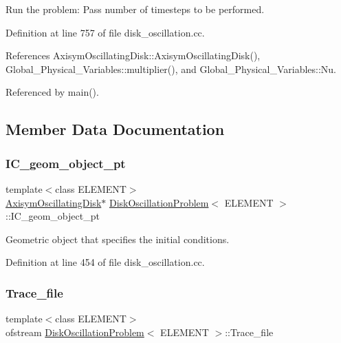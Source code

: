 Run the problem\+: Pass number of timesteps to be performed. 



Definition at line 757 of file disk\+\_\+oscillation.\+cc.



References Axisym\+Oscillating\+Disk\+::\+Axisym\+Oscillating\+Disk(), Global\+\_\+\+Physical\+\_\+\+Variables\+::multiplier(), and Global\+\_\+\+Physical\+\_\+\+Variables\+::\+Nu.



Referenced by main().



\subsection{Member Data Documentation}
\mbox{\label{classDiskOscillationProblem_a338517a04848bb75252751df32879e40}} 
\subsubsection{\texorpdfstring{I\+C\+\_\+geom\+\_\+object\+\_\+pt}{IC\_geom\_object\_pt}}
{\footnotesize\ttfamily template$<$class E\+L\+E\+M\+E\+NT$>$ \\
\hyperlink{classAxisymOscillatingDisk}{Axisym\+Oscillating\+Disk}$\ast$ \hyperlink{classDiskOscillationProblem}{Disk\+Oscillation\+Problem}$<$ E\+L\+E\+M\+E\+NT $>$\+::I\+C\+\_\+geom\+\_\+object\+\_\+pt\hspace{0.3cm}{\ttfamily [private]}}



Geometric object that specifies the initial conditions. 



Definition at line 454 of file disk\+\_\+oscillation.\+cc.

\mbox{\label{classDiskOscillationProblem_a45a4b574c10c6416b3b6be950713f505}} 
\subsubsection{\texorpdfstring{Trace\+\_\+file}{Trace\_file}}
{\footnotesize\ttfamily template$<$class E\+L\+E\+M\+E\+NT$>$ \\
ofstream \hyperlink{classDiskOscillationProblem}{Disk\+Oscillation\+Problem}$<$ E\+L\+E\+M\+E\+NT $>$\+::Trace\+\_\+file\hspace{0.3cm}{\ttfamily [private]}}



